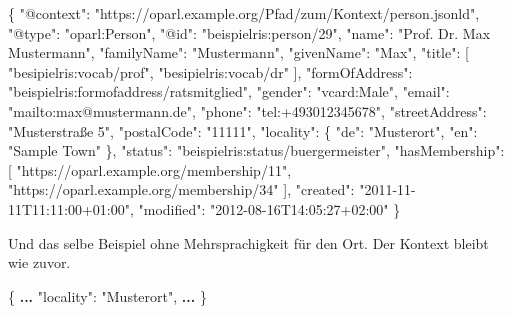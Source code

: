 \documentclass[,a4paper]{article}
\newenvironment{Shaded}{}{}
\newcommand{\DataTypeTok}[1]{\textcolor[rgb]{0.56,0.13,0.00}{{#1}}}
\newcommand{\StringTok}[1]{\textcolor[rgb]{0.25,0.44,0.63}{{#1}}}
\newcommand{\OtherTok}[1]{\textcolor[rgb]{0.00,0.44,0.13}{{#1}}}
\newcommand{\FunctionTok}[1]{\textcolor[rgb]{0.02,0.16,0.49}{{#1}}}
\newcommand{\ErrorTok}[1]{\textcolor[rgb]{1.00,0.00,0.00}{\textbf{{#1}}}}
\begin{document}
\begin{Shaded}
\begin{Highlighting}[]
\FunctionTok{\{}
    \DataTypeTok{"@context"}\FunctionTok{:} \StringTok{"https://oparl.example.org/Pfad/zum/Kontext/person.jsonld"}\FunctionTok{,}
    \DataTypeTok{"@type"}\FunctionTok{:} \StringTok{"oparl:Person"}\FunctionTok{,}
    \DataTypeTok{"@id"}\FunctionTok{:} \StringTok{"beispielris:person/29"}\FunctionTok{,}
    \DataTypeTok{"name"}\FunctionTok{:} \StringTok{"Prof. Dr. Max Mustermann"}\FunctionTok{,}
    \DataTypeTok{"familyName"}\FunctionTok{:} \StringTok{"Mustermann"}\FunctionTok{,}
    \DataTypeTok{"givenName"}\FunctionTok{:} \StringTok{"Max"}\FunctionTok{,}
    \DataTypeTok{"title"}\FunctionTok{:} \OtherTok{[}
        \StringTok{"besipielris:vocab/prof"}\OtherTok{,}
        \StringTok{"besipielris:vocab/dr"}
    \OtherTok{]}\FunctionTok{,}
    \DataTypeTok{"formOfAddress"}\FunctionTok{:} \StringTok{"beispielris:formofaddress/ratsmitglied"}\FunctionTok{,}
    \DataTypeTok{"gender"}\FunctionTok{:} \StringTok{"vcard:Male"}\FunctionTok{,}
    \DataTypeTok{"email"}\FunctionTok{:} \StringTok{"mailto:max@mustermann.de"}\FunctionTok{,}
    \DataTypeTok{"phone"}\FunctionTok{:} \StringTok{"tel:+493012345678"}\FunctionTok{,}
    \DataTypeTok{"streetAddress"}\FunctionTok{:} \StringTok{"Musterstraße 5"}\FunctionTok{,}
    \DataTypeTok{"postalCode"}\FunctionTok{:} \StringTok{"11111"}\FunctionTok{,}
    \DataTypeTok{"locality"}\FunctionTok{:} \FunctionTok{\{}
        \DataTypeTok{"de"}\FunctionTok{:} \StringTok{"Musterort"}\FunctionTok{,}
        \DataTypeTok{"en"}\FunctionTok{:} \StringTok{"Sample Town"}
    \FunctionTok{\},}
    \DataTypeTok{"status"}\FunctionTok{:} \StringTok{"beispielris:status/buergermeister"}\FunctionTok{,}
    \DataTypeTok{"hasMembership"}\FunctionTok{:} \OtherTok{[}
        \StringTok{"https://oparl.example.org/membership/11"}\OtherTok{,}
        \StringTok{"https://oparl.example.org/membership/34"}
    \OtherTok{]}\FunctionTok{,}
    \DataTypeTok{"created"}\FunctionTok{:} \StringTok{"2011-11-11T11:11:00+01:00"}\FunctionTok{,}
    \DataTypeTok{"modified"}\FunctionTok{:} \StringTok{"2012-08-16T14:05:27+02:00"}
\FunctionTok{\}}
\end{Highlighting}
\end{Shaded}

Und das selbe Beispiel ohne Mehrsprachigkeit für den Ort. Der Kontext
bleibt wie zuvor.

\begin{Shaded}
\begin{Highlighting}[]
\FunctionTok{\{}
    \ErrorTok{...}
    \DataTypeTok{"locality"}\FunctionTok{:} \StringTok{"Musterort"}\FunctionTok{,}
    \ErrorTok{...}
\FunctionTok{\}}
\end{Highlighting}
\end{Shaded}
\end{document}
